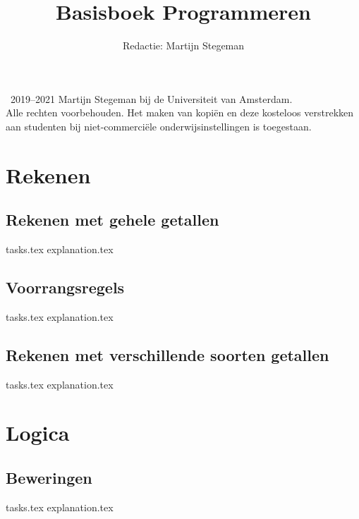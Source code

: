 \def\doclang{dutch}
\def\langdir{nl}




    \title{Basisboek Programmeren}
    \author{Redactie: Martijn Stegeman}
    \maketitle

    \textcopyright\ 2019--2021 Martijn Stegeman bij de Universiteit van Amsterdam.\\
    Alle rechten voorbehouden. Het maken van kopi\"en en deze kosteloos verstrekken aan studenten bij niet-commerci\"ele onderwijsinstellingen is toegestaan.

    \tableofcontents

    \chapter{Rekenen}
    \newpage

    \section{Rekenen met gehele getallen}
    {tasks.tex}          \newpage
    {explanation.tex}       \newpage

    \section{Voorrangsregels}
    {tasks.tex}        \newpage
    {explanation.tex}     \newpage

    \section{Rekenen met verschillende soorten getallen}
    {tasks.tex}            \newpage
    {explanation.tex}         \newpage

    \chapter{Logica}
    \newpage

    \section{Beweringen}
    {tasks.tex}         \newpage
    {explanation.tex}      \newpage


